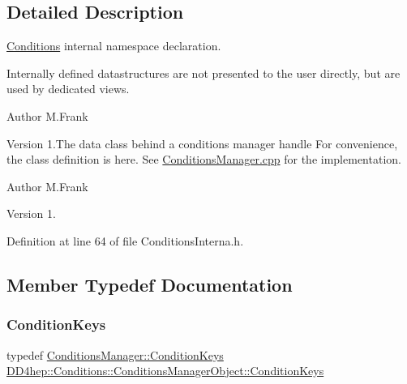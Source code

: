 \subsection{Detailed Description}
\hyperlink{namespace_d_d4hep_1_1_conditions}{Conditions} internal namespace declaration. 

Internally defined datastructures are not presented to the user directly, but are used by dedicated views.

\begin{DoxyAuthor}{Author}
M.\+Frank 
\end{DoxyAuthor}
\begin{DoxyVersion}{Version}
1.\+The data class behind a conditions manager handle For convenience, the class definition is here. See \hyperlink{_conditions_manager_8cpp}{Conditions\+Manager.\+cpp} for the implementation.
\end{DoxyVersion}
\begin{DoxyAuthor}{Author}
M.\+Frank 
\end{DoxyAuthor}
\begin{DoxyVersion}{Version}
1. 
\end{DoxyVersion}


Definition at line 64 of file Conditions\+Interna.\+h.



\subsection{Member Typedef Documentation}
\hypertarget{class_d_d4hep_1_1_conditions_1_1_conditions_manager_object_aad75140018040c6ad49e56a4d56a35ee}{}\label{class_d_d4hep_1_1_conditions_1_1_conditions_manager_object_aad75140018040c6ad49e56a4d56a35ee} 
\subsubsection{\texorpdfstring{Condition\+Keys}{ConditionKeys}}
{\footnotesize\ttfamily typedef \hyperlink{class_d_d4hep_1_1_conditions_1_1_conditions_manager_a8dd76f9acef2c8d3b7970e266fe7eff6}{Conditions\+Manager\+::\+Condition\+Keys} \hyperlink{class_d_d4hep_1_1_conditions_1_1_conditions_manager_object_aad75140018040c6ad49e56a4d56a35ee}{D\+D4hep\+::\+Conditions\+::\+Conditions\+Manager\+Object\+::\+Condition\+Keys}}



